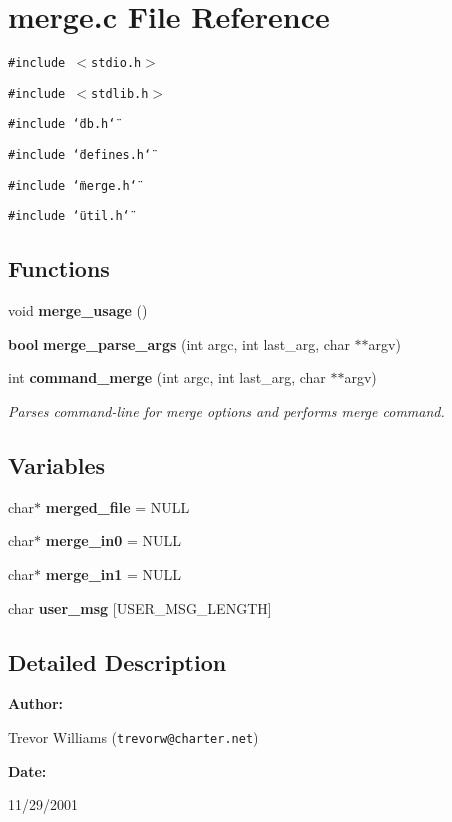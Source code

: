 \section{merge.c File Reference}
\label{merge_8c}
{\tt \#include $<$stdio.h$>$}\par
{\tt \#include $<$stdlib.h$>$}\par
{\tt \#include \char`\"{}db.h\char`\"{}}\par
{\tt \#include \char`\"{}defines.h\char`\"{}}\par
{\tt \#include \char`\"{}merge.h\char`\"{}}\par
{\tt \#include \char`\"{}util.h\char`\"{}}\par
\subsection*{Functions}
\begin{CompactItemize}
\item 
void {\bf merge\_\-usage} ()
\item 
{\bf bool} {\bf merge\_\-parse\_\-args} (int argc, int last\_\-arg, char $\ast$$\ast$argv)
\item 
int {\bf command\_\-merge} (int argc, int last\_\-arg, char $\ast$$\ast$argv)
\begin{CompactList}\small\item\em Parses command-line for merge options and performs merge command.\item\end{CompactList}\end{CompactItemize}
\subsection*{Variables}
\begin{CompactItemize}
\item 
char$\ast$ {\bf merged\_\-file} = NULL
\item 
char$\ast$ {\bf merge\_\-in0} = NULL
\item 
char$\ast$ {\bf merge\_\-in1} = NULL
\item 
char {\bf user\_\-msg} [USER\_\-MSG\_\-LENGTH]
\end{CompactItemize}


\subsection{Detailed Description}


\begin{Desc}
\item[{\bf Author: }]\par
Trevor Williams ({\tt trevorw@charter.net}) \end{Desc}
\begin{Desc}
\item[{\bf Date: }]\par
11/29/2001

\end{Desc}


